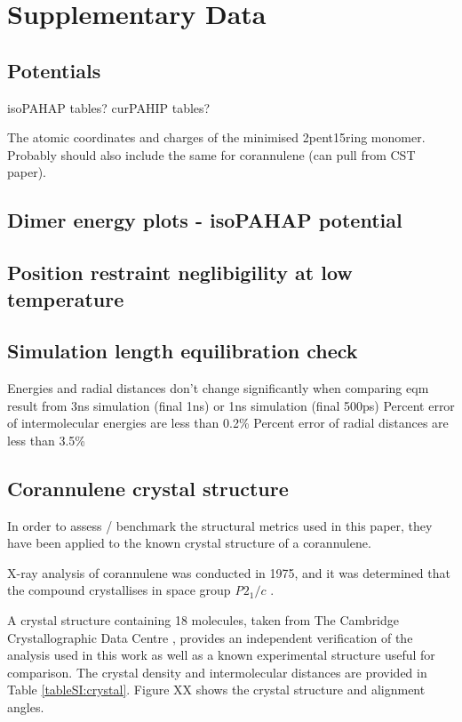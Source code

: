 \section{Supplementary Data}
\label{supplinfo}


\subsection{Potentials}
isoPAHAP tables?
curPAHIP tables?

The atomic coordinates and charges of the minimised 2pent15ring monomer.
Probably should also include the same for corannulene (can pull from CST paper).

\subsection{Dimer energy plots - isoPAHAP potential}

\subsection{Position restraint neglibigility at low temperature}

\subsection{Simulation length equilibration check}
Energies and radial distances don't change significantly when comparing eqm result from 3ns simulation (final 1ns) or 1ns simulation (final 500ps)
Percent error of intermolecular energies are less than 0.2\%
Percent error of radial distances are less than 3.5\%



\subsection{Corannulene crystal structure}
In order to assess / benchmark the structural metrics used in this paper, they have been applied to the known crystal structure of a corannulene. %

X-ray analysis of corannulene was conducted in 1975, and it was determined that the compound crystallises in space group \textit{P}$2_{1}/c$ \cite{hanson1976crystal}.

A crystal structure containing 18 molecules, taken from The Cambridge Crystallographic Data Centre \cite{CORANN11unitcell}, provides an independent verification of the analysis used in this work as well as a known experimental structure useful for comparison.  The crystal density and intermolecular distances are provided in Table \ref{tableSI:crystal}.  Figure XX shows the crystal structure and alignment angles.

